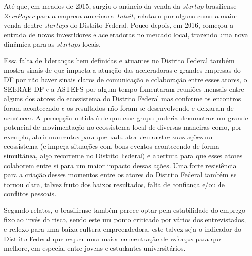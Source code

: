 Até que, em meados de 2015, surgiu o anúncio da venda da \textit{startup} brasiliense \textit{ZeroPaper} para a empresa americana \textit{Intuit}, relatado por alguns como a maior venda dentre \textit{startups} do Distrito Federal. Pouco depois, em 2016, começou a entrada de novos investidores e aceleradoras no mercado local, trazendo uma nova dinâmica para as \textit{startups} locais.

Essa falta de lideranças bem definidas e atuantes no Distrito Federal também mostra sinais de que impacta a atuação das aceleradoras e grandes empresas do DF por não haver sinais claros de comunicação e colaboração entre esses atores, o SEBRAE DF e a ASTEPS por algum tempo fomentaram reuniões mensais entre alguns dos atores do ecossistema do Distrito Federal mas conforme os encontros foram acontecendo e os resultados não foram se desenvolvendo e deixaram de acontecer. A percepção obtida é de que esse grupo poderia demonstrar um grande potencial de movimentação no ecossistema local de diversas maneiras como, por exemplo, abrir momentos para que cada ator demonstre suas ações no ecossistema (e impeça situações com bons eventos acontecendo de forma simultânea, algo recorrente no Distrito Federal) e abertura para que esses atores colaborem entre si para um maior impacto dessas ações. Uma forte resistência para a criação desses momentos entre os atores do Distrito Federal também se tornou clara, talvez fruto dos baixos resultados, falta de confiança e/ou de conflitos pessoais.

Segundo relatos, o brasiliense também parece optar pela estabilidade do emprego fixo ao invés do risco, sendo este um ponto criticado por vários dos entrevistados, e reflexo para uma baixa cultura empreendedora, este talvez seja o indicador do Distrito Federal que requer uma maior concentração de esforços para que melhore, em especial entre jovens e estudantes universitários. 

